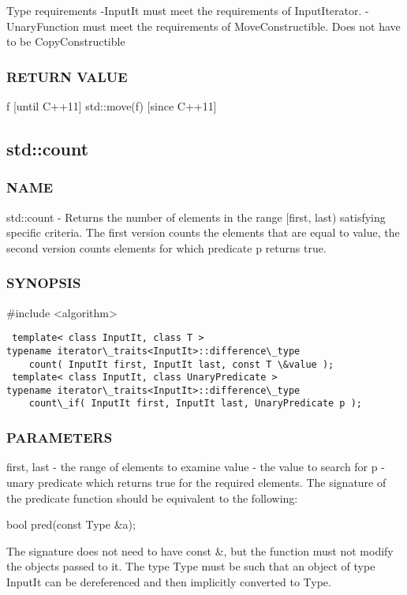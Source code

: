  Type requirements
 -InputIt must meet the requirements of InputIterator.
 -UnaryFunction must meet the requirements of MoveConstructible. Does not have to be CopyConstructible

\subsubsection{RETURN VALUE}
 f [until C++11]
 std::move(f) [since C++11]


\subsection{std::count}

\subsubsection{NAME}
std::count - Returns the number of elements in the range [first, last) satisfying specific criteria. The first version counts the elements that are equal to value, the second version counts elements for which predicate p returns true.

\subsubsection{SYNOPSIS}
\#include <algorithm>

\begin{lstlisting}
 template< class InputIt, class T >
typename iterator\_traits<InputIt>::difference\_type
    count( InputIt first, InputIt last, const T \&value );
 template< class InputIt, class UnaryPredicate >
typename iterator\_traits<InputIt>::difference\_type
    count\_if( InputIt first, InputIt last, UnaryPredicate p );
\end{lstlisting}

\subsubsection{PARAMETERS}
first, last - the range of elements to examine
value - the value to search for
p - unary predicate which returns true  for the required elements.
The signature of the predicate function should be equivalent to the following:

 bool pred(const Type \&a);

The signature does not need to have const \&, but the function must not modify the objects passed to it.
The type Type must be such that an object of type InputIt can be dereferenced and then implicitly converted to Type.

